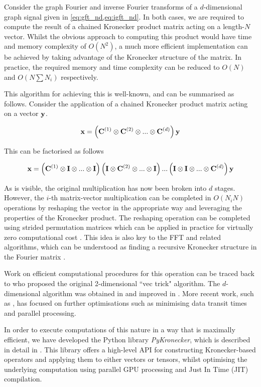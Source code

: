 Consider the graph Fourier and inverse Fourier transforms of a $d$-dimensional graph signal given in \cref{eq:gft_nd,eq:igft_nd}. In both cases, we are required to compute the result of a chained Kronecker product matrix acting on a length-$N$ vector. Whilst the obvious approach to computing this product would have time and memory complexity of $O(N^2)$, a much more efficient implementation can be achieved by taking advantage of the Kronecker structure of the matrix. In practice, the required memory and time complexity can be reduced to $O(N)$ and $O(N\sum N_i)$ respectively. 

This algorithm for achieving this is well-known, and can be summarised as follows. Consider the application of a chained Kronecker product matrix acting on a vector $\mathbf{y}$. 

$$
\mathbf{x} = \left( \mathbf{C}^{(1)} \otimes \mathbf{C}^{(2)} \otimes ... \otimes \mathbf{C}^{(d)}\right) \mathbf{y}
$$

This can be factorised as follows

$$
\mathbf{x} = \left( \mathbf{C}^{(1)} \otimes \mathbf{I} \otimes ... \otimes \mathbf{I} \right)\left( \mathbf{I} \otimes \mathbf{C}^{(2)} \otimes ... \otimes \mathbf{I} \right) ... \left( \mathbf{I} \otimes \mathbf{I} \otimes ... \otimes \mathbf{C}^{(d)} \right) \mathbf{y}
$$

As is visible, the original multiplication has now been broken into $d$ stages. However, the $i$-th matrix-vector multiplication can be completed in $O(N_i N)$ operations by reshaping the vector in the appropriate way and leveraging the properties of the Kronecker product. The reshaping operation can be completed using strided permutation matrices which can be applied in practice for virtually zero computational cost \citep{Granata1992}. This idea is also key to the FFT and related algorithms, which can be understood as finding a recursive Kronecker structure in the Fourier matrix \citep{Tolimieri2013}. 

Work on efficient computational procedures for this operation can be traced back to \cite{Roth1934} who proposed the original 2-dimensional ``vec trick" algorithm. The $d$-dimensional algorithm was obtained in \cite{Pereyra1973} and improved in \cite{DeBoor1979}. More recent work, such as \cite{Fackler2019}, has focused on further optimisations such as minimising data transit times and parallel processing. 

In order to execute computations of this nature in a way that is maximally efficient, we have developed the Python library \textit{PyKronecker}, which is described in detail in \cite{Antonian2023}. This library offers a high-level API for constructing Kronecker-based operators and applying them to either vectors or tensors, whilst optimising the underlying computation using parallel GPU processing and Just In Time (JIT) compilation. 


